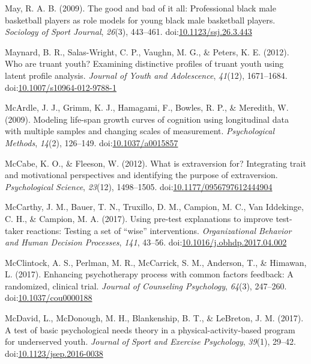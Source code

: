 \documentclass[english,man]{apa6}
\theoremstyle{definition}
\theoremstyle{definition}
\theoremstyle{definition}
\theoremstyle{remark}
\begin{document}
\hypertarget{ref-May2009}{}
May, R. A. B. (2009). The good and bad of it all: Professional black
male basketball players as role models for young black male basketball
players. \emph{Sociology of Sport Journal}, \emph{26}(3), 443--461.
doi:\href{https://doi.org/10.1123/ssj.26.3.443}{10.1123/ssj.26.3.443}

\hypertarget{ref-Maynard2012}{}
Maynard, B. R., Salas-Wright, C. P., Vaughn, M. G., \& Peters, K. E.
(2012). Who are truant youth? Examining distinctive profiles of truant
youth using latent profile analysis. \emph{Journal of Youth and
Adolescence}, \emph{41}(12), 1671--1684.
doi:\href{https://doi.org/10.1007/s10964-012-9788-1}{10.1007/s10964-012-9788-1}

\hypertarget{ref-McArdle2009}{}
McArdle, J. J., Grimm, K. J., Hamagami, F., Bowles, R. P., \& Meredith,
W. (2009). Modeling life-span growth curves of cognition using
longitudinal data with multiple samples and changing scales of
measurement. \emph{Psychological Methods}, \emph{14}(2), 126--149.
doi:\href{https://doi.org/10.1037/a0015857}{10.1037/a0015857}

\hypertarget{ref-McCabe2012}{}
McCabe, K. O., \& Fleeson, W. (2012). What is extraversion for?
Integrating trait and motivational perspectives and identifying the
purpose of extraversion. \emph{Psychological Science}, \emph{23}(12),
1498--1505.
doi:\href{https://doi.org/10.1177/0956797612444904}{10.1177/0956797612444904}

\hypertarget{ref-McCarthy2017}{}
McCarthy, J. M., Bauer, T. N., Truxillo, D. M., Campion, M. C., Van
Iddekinge, C. H., \& Campion, M. A. (2017). Using pre-test explanations
to improve test-taker reactions: Testing a set of ``wise''
interventions. \emph{Organizational Behavior and Human Decision
Processes}, \emph{141}, 43--56.
doi:\href{https://doi.org/10.1016/j.obhdp.2017.04.002}{10.1016/j.obhdp.2017.04.002}

\hypertarget{ref-McClintock2017}{}
McClintock, A. S., Perlman, M. R., McCarrick, S. M., Anderson, T., \&
Himawan, L. (2017). Enhancing psychotherapy process with common factors
feedback: A randomized, clinical trial. \emph{Journal of Counseling
Psychology}, \emph{64}(3), 247--260.
doi:\href{https://doi.org/10.1037/cou0000188}{10.1037/cou0000188}

\hypertarget{ref-McDavid2017}{}
McDavid, L., McDonough, M. H., Blankenship, B. T., \& LeBreton, J. M.
(2017). A test of basic psychological needs theory in a
physical-activity-based program for underserved youth. \emph{Journal of
Sport and Exercise Psychology}, \emph{39}(1), 29--42.
doi:\href{https://doi.org/10.1123/jsep.2016-0038}{10.1123/jsep.2016-0038}
\end{document}
